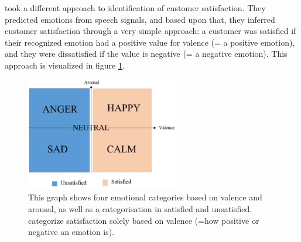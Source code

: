 \newline\newline \citet{Kamaruddin:2016:MeasuringCustomerSatisfaction} took a different approach to identification of customer satisfaction. They predicted emotions from speech signals, and based upon that, they inferred customer satisfaction through a very simple approach: a customer was satisfied if their recognized emotion had a positive value for valence (= a positive emotion), and they were dissatisfied if the value is negative (= a negative emotion). This approach is visualized in figure \ref{fig:SatisfactionFromVA}.

\begin{figure}[htpb]
  \begin{center}
  \includegraphics[angle=0, width=0.6\textwidth]{Figures/Satisfaction_from_VA.PNG}
  \caption[Interpretation of emotions]{This graph shows four emotional categories based on valence and arousal, as well as a categorisation in satisfied and unsatisfied. \citet{Kamaruddin:2016:MeasuringCustomerSatisfaction} categorize satisfaction solely based on valence (=how positive or negative an emotion is).}
  \label{fig:SatisfactionFromVA}
  \end{center}
\end{figure}

